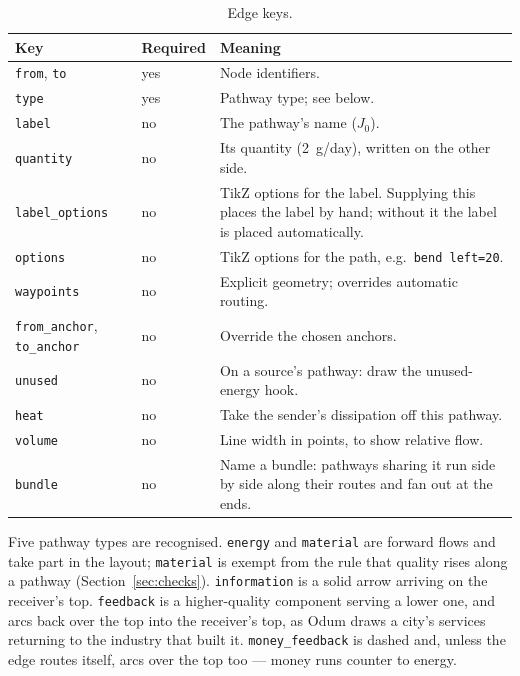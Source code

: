 \documentclass{article}
\begin{document}
\begin{table}[H]
\centering\small
\begin{tabular}{@{}>{\raggedright}p{} l p{}@{}}
\toprule
Key & Required & Meaning \\
\midrule
\texttt{from}, \texttt{to} & yes & Node identifiers. \\
\texttt{type}              & yes & Pathway type; see below. \\
\texttt{label}             & no  & The pathway's name ($J_0$). \\
\texttt{quantity}          & no  & Its quantity (2~g/day), written on the other side. \\
\texttt{label\_options}    & no  & TikZ options for the label. Supplying this places
the label by hand; without it the label is placed automatically. \\
\texttt{options}           & no  & TikZ options for the path, e.g.\ \texttt{bend left=20}. \\
\texttt{waypoints}         & no  & Explicit geometry; overrides automatic routing. \\
\texttt{from\_anchor}, \texttt{to\_anchor} & no & Override the chosen anchors. \\
\texttt{unused}            & no  & On a source's pathway: draw the unused-energy hook. \\
\texttt{heat}              & no  & Take the sender's dissipation off this pathway. \\
\texttt{volume}            & no  & Line width in points, to show relative flow. \\
\texttt{bundle}            & no  & Name a bundle: pathways sharing it run side by
side along their routes and fan out at the ends. \\
\bottomrule
\end{tabular}
\caption{Edge keys.}
\end{table}

Five pathway types are recognised. \texttt{energy} and \texttt{material} are
forward flows and take part in the layout; \texttt{material} is exempt from the
rule that quality rises along a pathway (Section~\ref{sec:checks}).
\texttt{information} is a solid arrow arriving on the receiver's top.
\texttt{feedback} is a higher-quality component serving a lower one, and arcs
back over the top into the receiver's top, as Odum draws a city's services
returning to the industry that built it. \texttt{money\_feedback} is dashed and,
unless the edge routes itself, arcs over the top too --- money runs counter to
energy.
\end{document}
